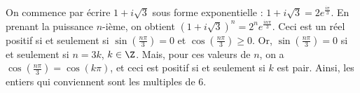 On commence par écrire $1+i\sqrt{3}$ sous forme exponentielle : $1+i\sqrt{3}=2e^{\frac{i \pi }{3}}$. En prenant la puissance $n$-ième, on obtient $(1+i\sqrt{3})^n =2^n e^{\frac{in\pi}{3}}$. Ceci est un réel positif si et seulement si $\sin\left( \frac{n \pi}{3} \right) =0$ et $\cos \left( \frac{n \pi}{3} \right) \geqslant 0$. Or, $\sin\left( \frac{n \pi}{3} \right)=0$ si et seulement si $n=3k$, $k \in \Z$. Mais, pour ces valeurs de $n$, on a $\cos \left( \frac{n \pi}{3} \right)=\cos(k\pi)$, et ceci est positif si et seulement si $k$ est pair. Ainsi, les entiers qui conviennent sont les multiples de 6.